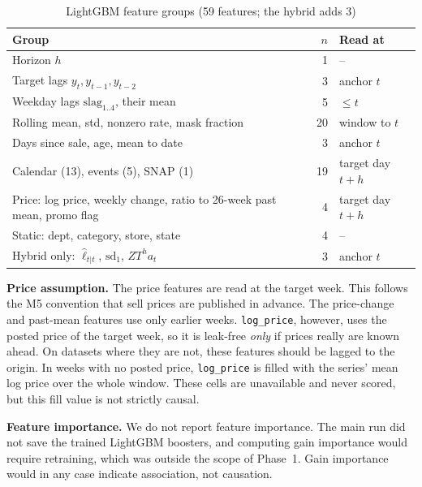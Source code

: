 \documentclass[conference]{IEEEtran}
\begin{document}
\begin{table}[t]
\caption{LightGBM feature groups (59 features; the hybrid adds 3)}
\label{tab:feat}
\centering
\footnotesize
\begin{tabular}{@{}p{}rp{}@{}}
\toprule
Group & $n$ & Read at \\
\midrule
Horizon $h$ & 1 & -- \\
Target lags $y_t, y_{t-1}, y_{t-2}$ & 3 & anchor $t$ \\
Weekday lags $\text{slag}_{1..4}$, their mean & 5 & $\le t$ \\
Rolling mean, std, nonzero rate, mask fraction & 20 & window to $t$ \\
Days since sale, age, mean to date & 3 & anchor $t$ \\
Calendar (13), events (5), SNAP (1) & 19 & target day $t{+}h$ \\
Price: log price, weekly change, ratio to 26-week past mean, promo flag & 4 & target day $t{+}h$ \\
Static: dept, category, store, state & 4 & -- \\
\midrule
Hybrid only: $\hat\ell_{t|t}$, $\mathrm{sd}_1$, $ZT^{h}a_t$ & 3 & anchor $t$ \\
\bottomrule
\end{tabular}
\end{table}

\textbf{Price assumption.} The price features are read at the target week. This follows the M5 convention that sell prices are published in advance. The price-change and past-mean features use only earlier weeks. \texttt{log\_price}, however, uses the posted price of the target week, so it is leak-free \emph{only} if prices really are known ahead. On datasets where they are not, these features should be lagged to the origin. In weeks with no posted price, \texttt{log\_price} is filled with the series' mean log price over the whole window. These cells are unavailable and never scored, but this fill value is not strictly causal.

\textbf{Feature importance.} We do not report feature importance. The main run did not save the trained LightGBM boosters, and computing gain importance would require retraining, which was outside the scope of Phase~1. Gain importance would in any case indicate association, not causation.
\end{document}
